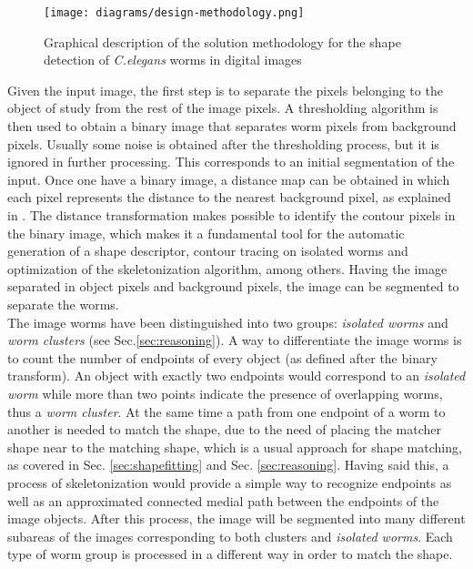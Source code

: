 \begin{figure}[h t b p ! H]
 \centering
   \texttt{[image: diagrams/design-methodology.png]}
 \caption{Graphical description of the solution methodology for the shape detection
 of \emph{C.elegans} worms in digital images}
\label{fig:methsol}
\end{figure}

Given the input image, the first step is to separate the pixels belonging to the object
of study from the rest of the image pixels. A thresholding algorithm is then used to
obtain a binary image that separates worm pixels from background pixels. Usually some
noise is obtained after the thresholding process, but it is ignored in further processing.
This corresponds to an initial segmentation of the input. Once one have a binary image, a
distance map can be obtained in which each pixel represents the distance to the 
nearest background pixel, as explained in \cite{dtresearch}. The distance transformation
makes possible to identify the contour pixels in the binary image, which makes it a fundamental
tool for the automatic generation of a shape descriptor, contour tracing on isolated worms 
and optimization of the skeletonization algorithm, among others. Having the image 
separated in object pixels and background pixels, the image can be segmented to separate
the worms. \\

The image worms have been distinguished into two groups: \emph{isolated worms}
and \emph{worm clusters} (see Sec.\ref{sec:reasoning}). A way to differentiate the image worms
is to count the number of endpoints of every object (as defined after the binary transform).
An object with exactly two endpoints would correspond to an \emph{isolated worm} while
more than two points indicate the presence of overlapping worms, thus a \emph{worm cluster}.
At the same time a path from one endpoint of a worm to another is needed to match
the shape, due to the need of placing the matcher shape near to the matching shape, which
is a usual approach for shape matching, as covered in Sec. \ref{sec:shapefitting} and
Sec. \ref{sec:reasoning}. Having said this, a process of skeletonization would provide a simple
way to recognize endpoints as well as an approximated connected medial path between the
endpoints of the image objects. After this process, the image will be segmented into 
many different subareas of the images corresponding to both clusters and \emph{isolated
worms}. Each type of worm group is processed in a different way in order to match
the shape.\\

